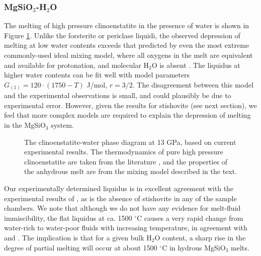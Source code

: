 \documentclass[review]{elsarticle}
\begin{document}
\subsubsection{MgSiO$_3$-H$_2$O}
The melting of high pressure clinoenstatite in the presence of water is shown in Figure \ref{fig:eoH}. Unlike the forsterite or periclase liquidi, the observed depression of melting at low water contents exceeds that predicted by even the most extreme commonly-used ideal mixing model, where all oxygens in the melt are equivalent and available for protonation, and molecular H$_2$O is absent \citep{SS1985}. The liquidus at higher water contents can be fit well with model parameters $G_{(1)} = 120 \cdot (1750-T)$ J/mol, $r=3/2$. The disagreement between this model and the experimental observations is small, and could plausibly be due to experimental error. However, given the results for stishovite (see next section), we feel that more complex models are required to explain the depression of melting in the MgSiO$_3$ system. 

\begin{figure}[ht!]
  \centering
  \caption{The clinoenstatite-water phase diagram at 13 GPa, based on current experimental results. The thermodynamics of pure high pressure clinoenstatite are taken from the literature \citep{SLB2011}, and the properties of the anhydrous melt are from the mixing model described in the text.}
  \label{fig:eoH}
\end{figure}

Our experimentally determined liquidus is in excellent agreement with the experimental results of \cite{YII2004}, as is the absence of stishovite in any of the sample chambers. We note that although we do not have any evidence for melt-fluid immiscibility, the flat liquidus at ca. 1500 $^{\circ}$C causes a very rapid change from water-rich to water-poor fluids with increasing temperature, in agreement with \cite{Inoue1994} and \cite{YII2004}. The implication is that for a given bulk H$_2$O content, a sharp rise in the degree of partial melting will occur at about 1500 $^{\circ}$C in hydrous MgSiO$_3$ melts.

\clearpage
\end{document}
